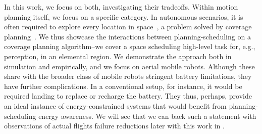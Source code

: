 In this work, we focus on both, investigating their tradeoffs. Within motion planning itself, we focus on a specific category. In autonomous scenarios, it is often required to explore every location in space~\citep{cao1988region,choset2000exact,arkin2001optimal,arkin2005optimal}, a problem solved by coverage planning~\citep{choset2001coverage,galceran2013survey}. We thus showcase the interactions between planning-scheduling on a coverage planning algorithm--we cover a space scheduling high-level task for, e.g., perception, in an elemental region. We demonstrate the approach both in simulation and empirically, and we focus on aerial mobile robots. Although these share with the broader class of mobile robots stringent battery limitations, they have further complications. In a conventional setup, for instance, it would be required landing to replace or recharge the battery. They thus, perhaps, provide an ideal instance of energy-constrained systems that would benefit from planning-scheduling energy awareness. We will see that we can back such a statement with observations of actual flights failure reductions later with this work in .

